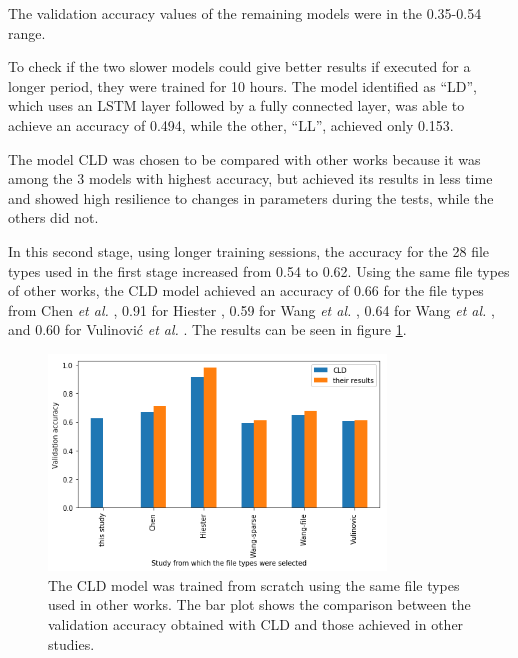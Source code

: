 The validation accuracy values of the remaining models were in the 0.35-0.54 range.


To check if the two slower models could give better results if executed for a longer period, they were trained for 10 hours. The model identified as ``LD'', which uses an LSTM layer followed by a fully connected layer, was able to achieve an accuracy of 0.494, while the other, ``LL'', achieved only 0.153.



The model CLD was chosen to be compared with other works because it was among the 3 models with highest accuracy, but achieved its results in less time and showed high resilience to changes in parameters during the tests, while the others did not.
 
In this second stage, using longer training sessions, the accuracy for the 28 file types used in the first stage increased from 0.54 to 0.62. Using the same file types of other works, the CLD model achieved an accuracy of 
0.66 for the file types from Chen \textit{et al.} \cite{chen_file_2018},
0.91 for Hiester \cite{hiester_file_2018}, 
0.59 for Wang \textit{et al.} \cite{wang_sparse_2018},
0.64 for Wang \textit{et al.} \cite{wang_file_2018},
and
0.60 for Vulinović \textit{et al.} \cite{vulinovic_neural_2019}.
The results can be seen in figure \ref{fig:cldothers}.

\noindent
\begin{figure}[htb!]
\centering\includegraphics[width=0.8\textwidth]{content/CLD-others.png}
\caption[CLD vs. other studies]{\label{fig:cldothers}The CLD model was trained from scratch using the same file types used in other works. The bar plot shows the comparison between the validation accuracy obtained with CLD and those achieved in other studies.}%
\end{figure}